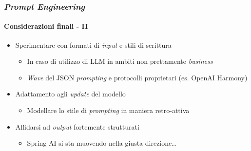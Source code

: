 \begin{frame}[t] \frametitle{\emph{Prompt Engineering}}
\framesubtitle{Considerazioni finali - II}
{\footnotesize
    \begin{minipage}[t]{\textwidth}
        \begin{itemize}[leftmargin=10pt,align=right]
            \item[\alert{\faArrowCircleRight}] \alert{Sperimentare con formati di \textit{input} e stili di scrittura}
            \begin{itemize}[leftmargin=10pt,align=right]
                \item[\alert{\alert{\faArrowCircleRight}}] In caso di utilizzo di LLM in ambiti non prettamente \textit{business}
                \item[\alert{\alert{\faArrowCircleRight}}] \textit{Wave} del \alert{JSON \textit{prompting}} e protocolli proprietari (es. OpenAI Harmony)
            \end{itemize}           
            \item[\alert{\faArrowCircleRight}] \alert{Adattamento agli \textit{update} del modello}
            \begin{itemize}[leftmargin=10pt,align=right]
                \item[\alert{\alert{\faArrowCircleRight}}] Modellare lo stile di \textit{prompting} in maniera retro-attiva
            \end{itemize}
            \item[\alert{\faArrowCircleRight}] \alert{Affidarsi ad \textit{output} fortemente strutturati}
            \begin{itemize}[leftmargin=10pt,align=right]
                \item[\alert{\alert{\faArrowCircleRight}}] Spring AI si sta muovendo nella giusta direzione\ldots
            \end{itemize}
        \end{itemize}
    \end{minipage}
}
\end{frame}
%
